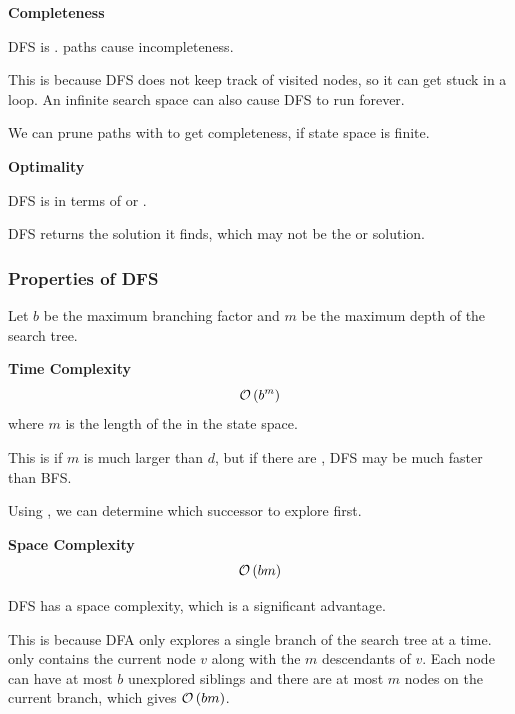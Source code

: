 \begin{listu}
    \item \textbf{Completeness}

    \begin{listu}
        \item DFS is .  paths cause incompleteness.
        \item This is because DFS does not keep track of visited nodes, so it can get stuck in a loop. An infinite search space can also cause DFS to run forever.
        \item We can prune paths with  to get completeness, if state space is finite.
    \end{listu}

    \item \textbf{Optimality}

    \begin{listu}
        \item DFS is  in terms of  or .
        \item DFS returns the  solution it finds, which may not be the  or  solution.
    \end{listu}
\end{listu}

\subsubsection{Properties of DFS}

Let $b$ be the maximum branching factor and $m$ be the maximum depth of the search tree.

\begin{listu}
    \item \textbf{Time Complexity} \[
        \mathcal{O}\left(b^m\right)
    \] where $m$ is the length of the  in the state space.

    \begin{listu}
        \item This is  if $m$ is much larger than $d$, but if there are , DFS may be much faster than BFS.
        \item Using , we can determine which successor to explore first.
    \end{listu}

    \item \textbf{Space Complexity} \[
        \mathcal{O}\left(bm\right)
    \]

    DFS has a  space complexity, which is a significant advantage.

    This is because DFA only explores a single branch of the search tree at a time. \Frontier only contains the current node $v$ along with the $m$ descendants of $v$.  Each node can have at most $b$ unexplored siblings and there are at most $m$ nodes on the current branch, which gives $\mathcal{O}\left(bm\right)$.
\end{listu}

